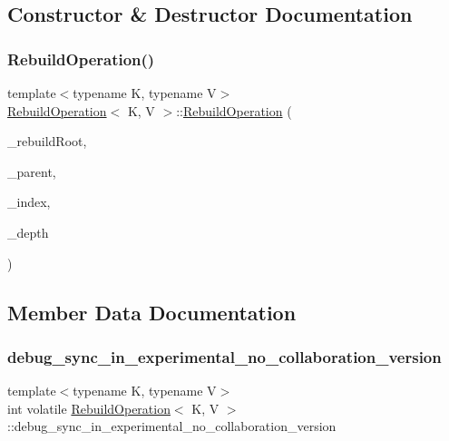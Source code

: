 \subsection{Constructor \& Destructor Documentation}
\mbox{\label{structRebuildOperation_a195f22f291fcdb59d26034b990b17743}} 
\subsubsection{\texorpdfstring{Rebuild\+Operation()}{RebuildOperation()}}
{\footnotesize\ttfamily template$<$typename K, typename V$>$ \\
\hyperlink{structRebuildOperation}{Rebuild\+Operation}$<$ K, V $>$\+::\hyperlink{structRebuildOperation}{Rebuild\+Operation} (\begin{DoxyParamCaption}\item[{\hyperlink{classNode}{Node}$<$ K, V $>$ $\ast$}]{\+\_\+rebuild\+Root,  }\item[{\hyperlink{classNode}{Node}$<$ K, V $>$ $\ast$}]{\+\_\+parent,  }\item[{size\+\_\+t}]{\+\_\+index,  }\item[{size\+\_\+t}]{\+\_\+depth }\end{DoxyParamCaption})\hspace{0.3cm}{\ttfamily [inline]}}



\subsection{Member Data Documentation}
\mbox{\label{structRebuildOperation_a2e558dded3e6061be573eddaa693e404}} 
\subsubsection{\texorpdfstring{debug\+\_\+sync\+\_\+in\+\_\+experimental\+\_\+no\+\_\+collaboration\+\_\+version}{debug\_sync\_in\_experimental\_no\_collaboration\_version}}
{\footnotesize\ttfamily template$<$typename K, typename V$>$ \\
int volatile \hyperlink{structRebuildOperation}{Rebuild\+Operation}$<$ K, V $>$\+::debug\+\_\+sync\+\_\+in\+\_\+experimental\+\_\+no\+\_\+collaboration\+\_\+version}

